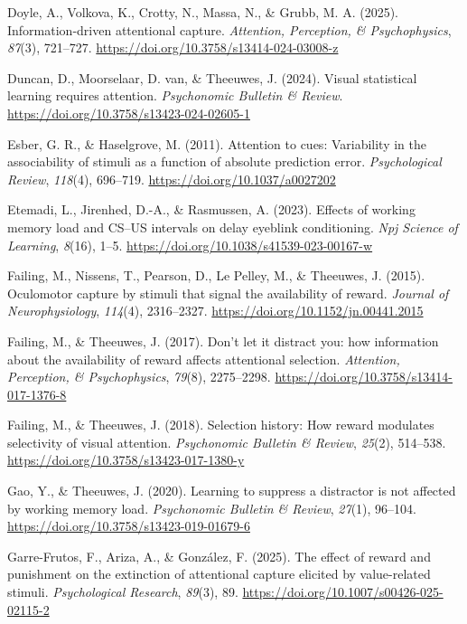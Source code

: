 \documentclass[
  man,
  floatsintext,
  longtable,
  nolmodern,
  notxfonts,
  notimes,
  mask,
  colorlinks=true,linkcolor=blue,citecolor=blue,urlcolor=blue]{apa7}
\newlength{\cslhangindent}
\newenvironment{CSLReferences}[2] %
 {\begin{list}{}{%
  \setlength{\itemindent}{0pt}
  \setlength{\leftmargin}{0pt}
  \setlength{\parsep}{0pt}
  \ifodd #1
   \setlength{\leftmargin}{\cslhangindent}
   \setlength{\itemindent}{-1\cslhangindent}
  \fi
  \setlength{\itemsep}{#2\baselineskip}}}
 {\end{list}}
\begin{document}
\begin{CSLReferences}{1}{0}
Doyle, A., Volkova, K., Crotty, N., Massa, N., \& Grubb, M. A. (2025).
Information-driven attentional capture. \emph{Attention, Perception, \&
Psychophysics}, \emph{87}(3), 721--727.
\url{https://doi.org/10.3758/s13414-024-03008-z}

Duncan, D., Moorselaar, D. van, \& Theeuwes, J. (2024). Visual
statistical learning requires attention. \emph{Psychonomic Bulletin \&
Review}. \url{https://doi.org/10.3758/s13423-024-02605-1}

Esber, G. R., \& Haselgrove, M. (2011). Attention to cues: Variability
in the associability of stimuli as a function of absolute prediction
error. \emph{Psychological Review}, \emph{118}(4), 696--719.
\url{https://doi.org/10.1037/a0027202}

Etemadi, L., Jirenhed, D.-A., \& Rasmussen, A. (2023). Effects of
working memory load and {CS}--{US} intervals on delay eyeblink
conditioning. \emph{Npj Science of Learning}, \emph{8}(16), 1--5.
\url{https://doi.org/10.1038/s41539-023-00167-w}

Failing, M., Nissens, T., Pearson, D., Le Pelley, M., \& Theeuwes, J.
(2015). Oculomotor capture by stimuli that signal the availability of
reward. \emph{Journal of Neurophysiology}, \emph{114}(4), 2316--2327.
\url{https://doi.org/10.1152/jn.00441.2015}

Failing, M., \& Theeuwes, J. (2017). Don{'}t let it distract you: how
information about the availability of reward affects attentional
selection. \emph{Attention, Perception, \& Psychophysics}, \emph{79}(8),
2275--2298. \url{https://doi.org/10.3758/s13414-017-1376-8}

Failing, M., \& Theeuwes, J. (2018). Selection history: How reward
modulates selectivity of visual attention. \emph{Psychonomic Bulletin \&
Review}, \emph{25}(2), 514--538.
\url{https://doi.org/10.3758/s13423-017-1380-y}

Gao, Y., \& Theeuwes, J. (2020). Learning to suppress a distractor is
not affected by working memory load. \emph{Psychonomic Bulletin \&
Review}, \emph{27}(1), 96--104.
\url{https://doi.org/10.3758/s13423-019-01679-6}

Garre-Frutos, F., Ariza, A., \& González, F. (2025). The effect of
reward and punishment on the extinction of attentional capture elicited
by value-related stimuli. \emph{Psychological Research}, \emph{89}(3),
89. \url{https://doi.org/10.1007/s00426-025-02115-2}


\end{CSLReferences}
\end{document}
